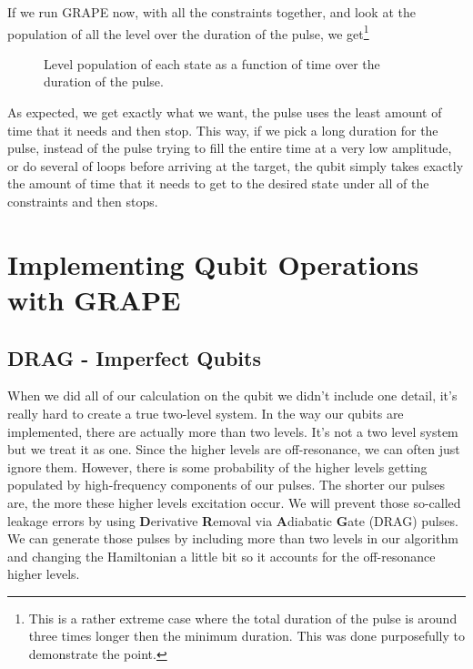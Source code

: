 If we run GRAPE now, with all the constraints together, and look at the population of all the level over the duration of the pulse, we get\footnote{This is a rather extreme case where the total duration of the pulse is around three times longer then the minimum duration. This was done purposefully to demonstrate the point.}
\begin{figure}[H]
    \begin{center}
        
    \end{center}
    \caption{Level population of each state as a function of time over the duration of the pulse.}
    \label{fig:dur-penelty}
\end{figure}

As expected, we get exactly what we want, the pulse uses the least amount of time that it needs and then stop. This way, if we pick a long duration for the pulse, instead of the pulse trying to fill the entire time at a very low amplitude, or do several of loops before arriving at the target, the qubit simply takes exactly the amount of time that it needs to get to the desired state under all of the constraints and then stops.

\section{Implementing Qubit Operations with GRAPE}

\subsection{DRAG - Imperfect Qubits} \label{sec:DRAG}
When we did all of our calculation on the qubit we didn't include one detail, it's really hard to create a true two-level system. In the way our qubits are implemented, there are actually more than two levels. It's not a two level system but we treat it as one. Since the higher levels are off-resonance, we can often just ignore them. However, there is some probability of the higher levels getting populated by high-frequency components of our pulses. The shorter our pulses are, the more these higher  levels excitation occur. We will prevent those so-called leakage errors by using \textbf{D}erivative \textbf{R}emoval via \textbf{A}diabatic \textbf{G}ate (DRAG) pulses. We can generate those pulses by including more than two levels in our algorithm and changing the Hamiltonian a little bit so it accounts for the off-resonance higher levels.

